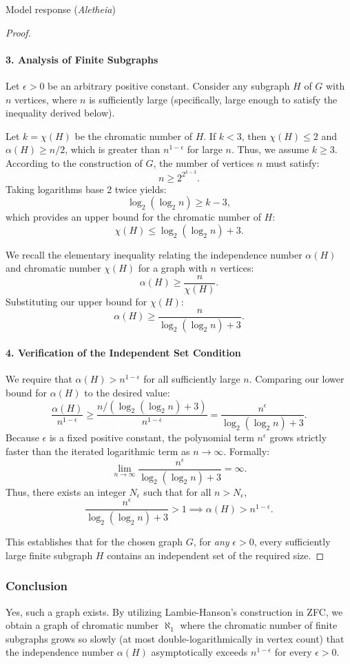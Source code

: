 \documentclass[11pt]{article}
\begin{document}
\begin{solution}{Model response (\emph{Aletheia})}
\begin{proof}
\paragraph{3. Analysis of Finite Subgraphs}
Let $\epsilon > 0$ be an arbitrary positive constant. Consider any subgraph $H$ of $G$ with $n$ vertices, where $n$ is sufficiently large (specifically, large enough to satisfy the inequality derived below).

Let $k = \chi(H)$ be the chromatic number of $H$. If $k < 3$, then $\chi(H) \le 2$ and $\alpha(H) \ge n/2$, which is greater than $n^{1-\epsilon}$ for large $n$. Thus, we assume $k \ge 3$.
According to the construction of $G$, the number of vertices $n$ must satisfy:
\[ n \ge 2^{2^{k-3}}. \]
Taking logarithms base 2 twice yields:
\[ \log_2(\log_2 n) \ge k - 3, \]
which provides an upper bound for the chromatic number of $H$:
\[ \chi(H) \le \log_2(\log_2 n) + 3. \]

We recall the elementary inequality relating the independence number $\alpha(H)$ and chromatic number $\chi(H)$ for a graph with $n$ vertices:
\[ \alpha(H) \ge \frac{n}{\chi(H)}. \]
Substituting our upper bound for $\chi(H)$:
\[ \alpha(H) \ge \frac{n}{\log_2(\log_2 n) + 3}. \]

\paragraph{4. Verification of the Independent Set Condition}
We require that $\alpha(H) > n^{1-\epsilon}$ for all sufficiently large $n$. Comparing our lower bound for $\alpha(H)$ to the desired value:
\[ \frac{\alpha(H)}{n^{1-\epsilon}} \ge \frac{n / (\log_2(\log_2 n) + 3)}{n^{1-\epsilon}} = \frac{n^\epsilon}{\log_2(\log_2 n) + 3}. \]
Because $\epsilon$ is a fixed positive constant, the polynomial term $n^\epsilon$ grows strictly faster than the iterated logarithmic term as $n \to \infty$. Formally:
\[ \lim_{n \to \infty} \frac{n^\epsilon}{\log_2(\log_2 n) + 3} = \infty. \]
Thus, there exists an integer $N_\epsilon$ such that for all $n > N_\epsilon$,
\[ \frac{n^\epsilon}{\log_2(\log_2 n) + 3} > 1 \implies \alpha(H) > n^{1-\epsilon}. \]

This establishes that for the chosen graph $G$, for \textit{any} $\epsilon > 0$, every sufficiently large finite subgraph $H$ contains an independent set of the required size.
\end{proof}

\subsubsection*{Conclusion}
Yes, such a graph exists. By utilizing Lambie-Hanson's construction in ZFC, we obtain a graph of chromatic number $\aleph_1$ where the chromatic number of finite subgraphs grows so slowly (at most double-logarithmically in vertex count) that the independence number $\alpha(H)$ asymptotically exceeds $n^{1-\epsilon}$ for every $\epsilon > 0$.
\end{solution}
\end{document}
